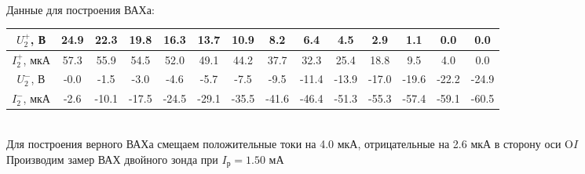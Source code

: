\documentclass[a4paper,12pt]{extarticle}
\begin{document}
\begin{minipage}{1\textwidth}
\end{minipage} \\
Данные для построения ВАХа: \\
\begin{tabular}{|c|c|c|c|c|c|c|c|c|c|c|c|c|c|}
\hline
$U_2^+$, В      & 24.9 & 22.3  & 19.8  & 16.3  & 13.7  & 10.9  & 8.2   & 6.4   & 4.5   & 2.9   & 1.1   & 0.0   & 0.0   \\ \hline
$I_2^+$, мкА    & 57.3 & 55.9  & 54.5  & 52.0  & 49.1  & 44.2  & 37.7  & 32.3  & 25.4  & 18.8  & 9.5   & 4.0   & 0.0   \\ \hline
$U_2^-$, В  & -0.0 & -1.5  & -3.0  & -4.6  & -5.7  & -7.5  & -9.5  & -11.4 & -13.9 & -17.0 & -19.6 & -22.2 & -24.9 \\ \hline
$I_2^-$, мкА  & -2.6 & -10.1 & -17.5 & -24.5 & -29.1 & -35.5 & -41.6 & -46.4 & -51.3 & -55.3 & -57.4 & -59.1 & -60.5 \\ \hline
\end{tabular}\\
Для построения верного ВАХа смещаем положительные токи на 4.0 мкА, отрицательные на 2.6 мкА в сторону оси O$I$ \\

Производим замер ВАХ двойного зонда при $I_{\text{р}} = 1.50$ мА
\end{document}
